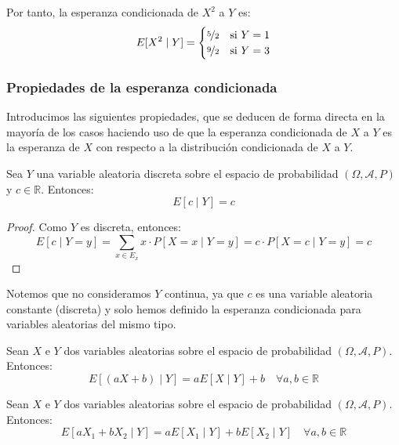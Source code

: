 \begin{ejemplo}
    Por tanto, la esperanza condicionada de $X^2$ a $Y$ es:
    \begin{equation*}
        E[X^2\mid Y] = \begin{cases}
            \nicefrac{5}{2} & \text{si } Y=1 \\
            \nicefrac{9}{2} & \text{si } Y=3
        \end{cases}
    \end{equation*}
\end{ejemplo}

\subsubsection{Propiedades de la esperanza condicionada}

Introducimos las siguientes propiedades, que se deducen de forma directa en la mayoría de los casos haciendo uso de que la esperanza condicionada de $X$ a $Y$ es la esperanza de $X$ con respecto a la distribución condicionada de $X$ a $Y$.
\begin{prop}
    Sea $Y$ una variable aleatoria discreta sobre el espacio de probabilidad $(\Omega, \mathcal{A}, P)$ y $c\in \mathbb{R}$. Entonces:
    \begin{equation*}
        E[c\mid Y] = c
    \end{equation*}
\end{prop}
\begin{proof}
    Como $Y$ es discreta, entonces:
    \begin{equation*}
        E[c\mid Y = y] = \sum_{x\in E_x} x\cdot P[X = x\mid Y = y] = c\cdot P[X = c\mid Y = y] = c
    \end{equation*}
\end{proof}
Notemos que no consideramos $Y$ continua, ya que $c$ es una variable aleatoria constante (discreta) y solo hemos definido la esperanza condicionada para variables aleatorias del mismo tipo.

\begin{prop}[Linealidad]
    Sean $X$ e $Y$ dos variables aleatorias sobre el espacio de probabilidad $(\Omega, \mathcal{A}, P)$. Entonces:
    \begin{equation*}
        E[(aX+b)\mid Y] = aE[X\mid Y] + b \quad \forall a,b\in\mathbb{R}
    \end{equation*}
\end{prop}

\begin{prop}
    Sean $X$ e $Y$ dos variables aleatorias sobre el espacio de probabilidad $(\Omega, \mathcal{A}, P)$. Entonces:
    \begin{equation*}
        E[aX_1+bX_2\mid Y] = aE[X_1\mid Y] + bE[X_2\mid Y] \quad \forall a,b\in\mathbb{R}
    \end{equation*}
\end{prop}

